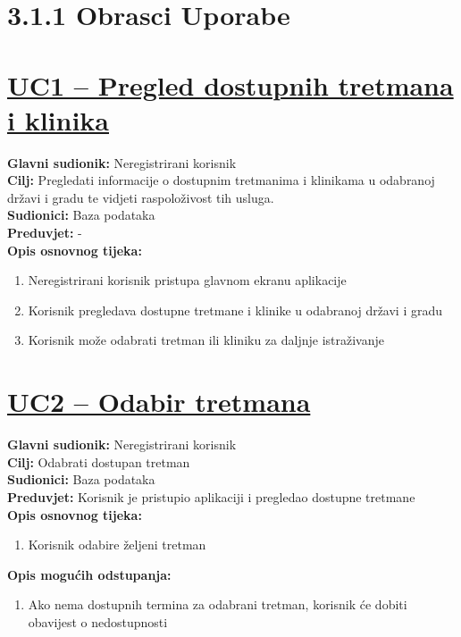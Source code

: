 \documentclass{article}
\begin{document}
	
	\section*{3.1.1 Obrasci Uporabe}
	\section*{\underline{UC1 – Pregled dostupnih tretmana i klinika}}
	\textbf{Glavni sudionik:} Neregistrirani korisnik \\
	\textbf{Cilj:} Pregledati informacije o dostupnim tretmanima i klinikama u odabranoj državi i gradu te vidjeti raspoloživost tih usluga. \\
	\textbf{Sudionici:} Baza podataka \\
	\textbf{Preduvjet:} - \\
	\textbf{Opis osnovnog tijeka:}
	\begin{enumerate}
		\item Neregistrirani korisnik pristupa glavnom ekranu aplikacije
		\item Korisnik pregledava dostupne tretmane i klinike u odabranoj državi i gradu
		\item Korisnik može odabrati tretman ili kliniku za daljnje istraživanje
	\end{enumerate}
	
	
	\section*{\underline {UC2 – Odabir tretmana}}
	\textbf{Glavni sudionik:} Neregistrirani korisnik \\
	\textbf{Cilj:} Odabrati dostupan tretman \\
	\textbf{Sudionici:} Baza podataka \\
	\textbf{Preduvjet:} Korisnik je pristupio aplikaciji i pregledao dostupne tretmane \\
	\textbf{Opis osnovnog tijeka:}
	\begin{enumerate}
		\item Korisnik odabire željeni tretman
	\end{enumerate}
	\textbf{Opis mogućih odstupanja:}
	\begin{enumerate}
		\item Ako nema dostupnih termina za odabrani tretman, korisnik će dobiti obavijest o nedostupnosti
	\end{enumerate}
	
\end{document}
